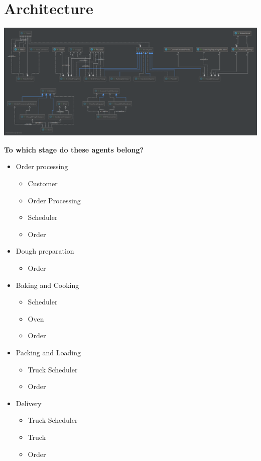 \section{Architecture}
	\includegraphics[scale=0.7]{./Architecture_small.png}
	
\newpage
\textbf{ To which stage do these agents belong?}
{\small 
\begin{itemize}
	\item Order processing
	\begin{itemize}
		\item Customer
		\item Order Processing
		\item Scheduler
		\item Order
	\end{itemize}
	\item Dough preparation
	\begin{itemize}
		\item Order
	\end{itemize}
	\item Baking and Cooking
	\begin{itemize}
		\item Scheduler
		\item Oven
		\item Order
	\end{itemize}
	\item Packing and Loading
	\begin{itemize}
		\item Truck Scheduler
		\item Order
	\end{itemize}
	\item Delivery
	\begin{itemize}
		\item Truck Scheduler
		\item Truck
		\item Order
	\end{itemize}
\end{itemize}}
 
